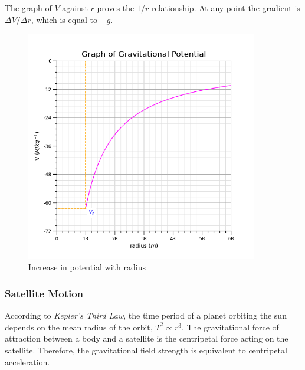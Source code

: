 \documentclass[12pt]{article}
\begin{document}
The graph of \(V\) against \(r\) proves the \(1/r\) relationship. At any point the gradient is \(\Delta V / \Delta r\), which is equal to \(-g\).

\begin{figure}[H]
\centering
\includegraphics[width=0.9\textwidth,keepaspectratio]{./images/gravitational_potential.png}
\caption{Increase in potential with radius}
\end{figure}

\subsubsection{Satellite Motion}
\label{sec:orge2201c0}

According to \emph{Kepler's Third Law}, the time period of a planet orbiting the sun depends on the mean radius of the orbit,  \(T^2 \propto r^3\). The gravitational force of attraction between a body and a satellite is the centripetal force acting on the satellite. Therefore, the gravitational field strength is equivalent to centripetal acceleration.
\end{document}
